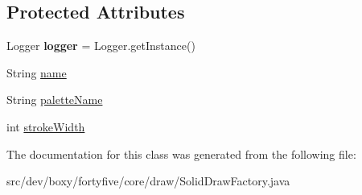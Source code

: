 \subsection*{Protected Attributes}
\begin{DoxyCompactItemize}
\item 
\hypertarget{classdev_1_1boxy_1_1fortyfive_1_1core_1_1draw_1_1_solid_draw_factory_aa9e15837c50c1f359716dc4d1873f879}{
Logger {\bfseries logger} = Logger.getInstance()}
\label{de/d7a/classdev_1_1boxy_1_1fortyfive_1_1core_1_1draw_1_1_solid_draw_factory_aa9e15837c50c1f359716dc4d1873f879}

\item 
String \hyperlink{group___solid_draw_ga2d76fd9b9b039a2df1d3a2fd1e7c2ceb}{name}
\item 
String \hyperlink{group___solid_draw_ga294947fca0b2ad2e755107ec48d1af5e}{paletteName}
\item 
int \hyperlink{group___solid_draw_ga6a9bdc83f9a995edf6d728c0834f0aea}{strokeWidth}
\end{DoxyCompactItemize}


The documentation for this class was generated from the following file:\begin{DoxyCompactItemize}
\item 
src/dev/boxy/fortyfive/core/draw/SolidDrawFactory.java\end{DoxyCompactItemize}
